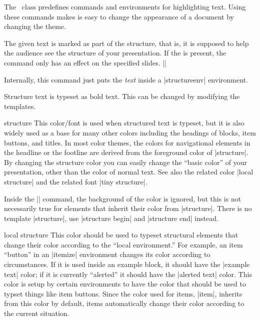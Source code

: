 The \beamer\ class predefines commands and environments for highlighting text. Using these commands makes is easy to change the appearance of a document by changing the theme.

\begin{command}{\structure{}}
  The given text is marked as part of the structure, that is, it is supposed to help the audience see the structure of your presentation. If the  is present, the command only has an effect on the specified slides.
  \example
  ||

  Internally, this command just puts the \emph{text} inside a |structureenv| environment.

  \articlenote
  Structure text is typeset as bold text. This can be changed by modifying the templates.

  \begin{element}{structure}\no\yes\yes
    This color/font is used when structured text is typeset, but it is also widely used as a base for many other colors including the headings of blocks, item buttons, and titles. In most color themes, the colors for navigational elements in the headline or the footline are derived from the foreground color of |structure|. By changing the structure color you can easily change the ``basic color'' of your presentation, other than the color of normal text. See also the related color |local structure| and the related font |tiny structure|.

    Inside the |\structure| command, the background of the color is ignored, but this is not necessarily true for elements that inherit their color from |structure|. There is no template |structure|, use |structure begin| and |structure end| instead.
  \end{element}

  \begin{element}{local structure}\no\yes\no
    This color should be used to typeset structural elements that change their color according to the ``local environment.'' For example, an item ``button'' in an |itemize| environment changes its color according to circumstances. If it is used inside an example block, it should have the |example text| color; if it is currently ``alerted'' it should have the |alerted text| color. This color is setup by certain environments to have the color that should be used to typset things like item buttons. Since the color used for items, |item|, inherits from this color by default, items automatically change their color according to the current situation.


\end{element}
\end{command}
